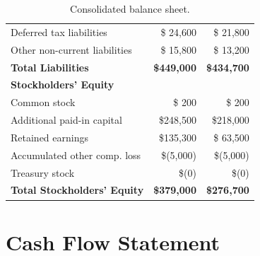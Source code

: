 \documentclass[
    language=english,
    doctype=financial-report,
    institution=none,
]{../../omnilatex}
\begin{document}
\begin{table}[h]
\begin{tabular}{lrr}
        \quad Deferred tax liabilities    & \$ 24,600 & \$ 21,800 \\
        \quad Other non-current liabilities & \$ 15,800 & \$ 13,200 \\
        \midrule
        \textbf{Total Liabilities}       & \textbf{\$449,000} & \textbf{\$434,700} \\
        \midrule
        \textbf{Stockholders' Equity}    & & \\
        \quad Common stock                & \$ 200    & \$ 200 \\
        \quad Additional paid-in capital  & \$248,500 & \$218,000 \\
        \quad Retained earnings           & \$135,300 & \$ 63,500 \\
        \quad Accumulated other comp. loss & \$(5,000) & \$(5,000) \\
        \quad Treasury stock              & \$(\phantom{0}0) & \$(\phantom{0}0) \\
        \midrule
        \textbf{Total Stockholders' Equity} & \textbf{\$379,000} & \textbf{\$276,700} \\
        \bottomrule
    \end{tabular}
    \caption{Consolidated balance sheet.}
\end{table}

\section{Cash Flow Statement}
\end{document}

